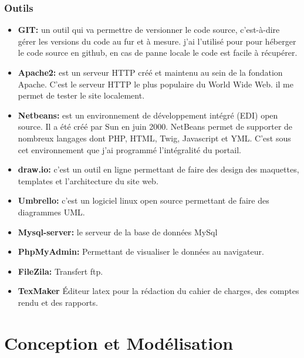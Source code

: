 \documentclass[12pt]{article}
\begin{document}
\subsubsection{Outils}

\begin{itemize}


\item \textbf{GIT:} un outil qui va  permettre de versionner le code source, c'est-à-dire gérer les versions du code au fur et à mesure. j'ai l'utilisé pour pour héberger le code source  en github, en cas de panne locale le
code est facile à récupérer.

\item  \textbf{Apache2:} est un serveur HTTP créé et maintenu au sein de la fondation Apache. C'est le serveur HTTP le plus populaire du World Wide Web. il me permet de tester le site localement.

\item  \textbf{Netbeans:} est un environnement de développement intégré (EDI) open source. Il a
été créé par Sun en juin 2000. NetBeans permet de supporter de nombreux
langages dont PHP, HTML, Twig, Javascript et YML. C’est sous cet environnement que j’ai programmé l’intégralité du portail.


\item \textbf{draw.io:} c'est un outil en ligne permettant de faire des design des maquettes, templates et l’architecture du site web.

\item \textbf{Umbrello:} c'est un logiciel linux open source permettant de faire des diagrammes UML.

\item \textbf{Mysql-server:} le serveur de la base de données MySql

\item \textbf{PhpMyAdmin: } Permettant de visualiser le données au navigateur.

\item \textbf{FileZila:} Transfert ftp.

\item \textbf{TexMaker} Éditeur latex pour la rédaction du cahier de charges, des comptes rendu et des rapports.
\end{itemize}



\newpage

\section{Conception et Modélisation  }
\end{document}
